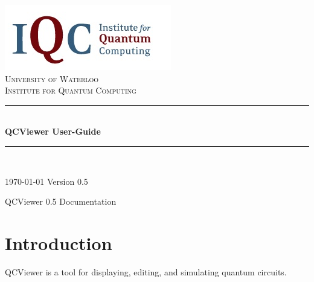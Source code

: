 \documentclass[10pt]{article}
\theoremstyle{definition}
\newcommand{\HRule}{\rule{\linewidth}{0.5mm}}
\begin{document}
\begin{titlepage}

\begin{center}


\includegraphics{Figures/Logo.png}\\[1cm]    

\textsc{\LARGE University of Waterloo}\\[1.5cm]

\textsc{\Large Institute for Quantum Computing}\\[0.5cm]


\HRule \\[0.4cm]
{ \huge \bfseries QCViewer User-Guide}\\[0.4cm]

\HRule \\[1.5cm]

\vfill

{\large \today}
{\large Version 0.5}

\end{center}

\end{titlepage}

\tableofcontents
\newpage

    \begin{flushright}
    QCViewer 0.5 Documentation
    \end{flushright}

\section{Introduction} \label{sec:Introduction}

QCViewer is a tool for displaying, editing, and simulating quantum circuits. 
\end{document}
